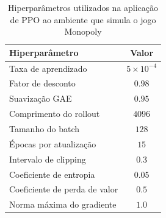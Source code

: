 \documentclass[aspectratio=169]{beamer}
\begin{document}
\begin{frame}

    \begin{table}[h!]
        \caption{Hiperparâmetros utilizados na aplicação de PPO ao ambiente que simula o jogo Monopoly}
        \begin{center}
            \begin{tabular}{|l|c|}
                \hline
                \textbf{Hiperparâmetro}              & \textbf{Valor}    \\
                \hline
                Taxa de aprendizado                  & $5\times10^{-4}$  \\
                \hline
                Fator de desconto                    & $0.98$            \\
                \hline
                Suavização GAE                       & $0.95$            \\
                \hline
                Comprimento do rollout               & $4096$            \\
                \hline
                Tamanho do batch                     & $128$             \\
                \hline
                Épocas por atualização               & $15$              \\
                \hline
                Intervalo de clipping                & $0.3$             \\
                \hline
                Coeficiente de entropia              & $0.05$            \\
                \hline
                Coeficiente de perda de valor        & $0.5$             \\
                \hline
                Norma máxima do gradiente            & $1.0$             \\
                \hline
            \end{tabular}
        \label{tab:ppo_hyperparams}
        \end{center}
    \end{table}

\end{frame}
\end{document}

